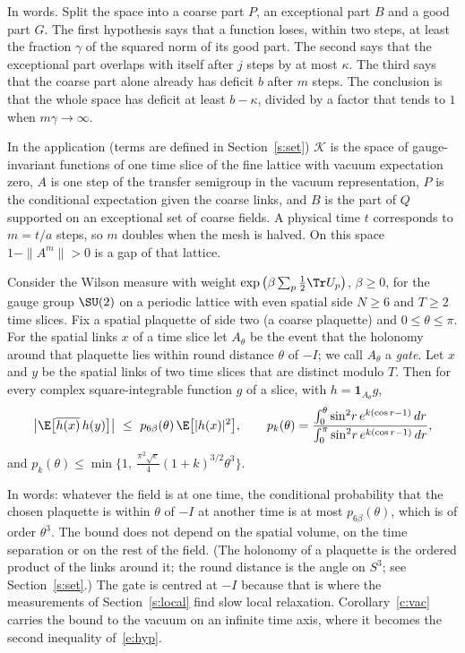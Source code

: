 In words. Split the space into a coarse part $P$, an exceptional part $B$ and a good part $G$. The first
hypothesis says that a function loses, within two steps, at least the fraction $\gamma$ of the squared norm of
its good part. The second says that the exceptional part overlaps with itself after $j$ steps by at most
$\kappa$. The third says that the coarse part alone already has deficit $b$ after $m$ steps. The conclusion is
that the whole space has deficit at least $b-\kappa$, divided by a factor that tends to $1$ when $m\gamma\to\infty$.

In the application (terms are defined in Section~\ref{s:set}) $\mathcal K$ is the space of gauge-invariant
functions of one time slice of the fine lattice with vacuum expectation zero, $A$ is one step of the transfer
semigroup in the vacuum representation, $P$ is the conditional expectation given the coarse links, and $B$
is the part of $Q$ supported on an exceptional set of coarse fields. A physical time $t$ corresponds to
$m=t/a$ steps, so $m$ doubles when the mesh is halved. On this space $1-\|A^m\|>0$ is a gap of that lattice.

\begin{theorem}\label{t:ret}
Consider the Wilson measure with weight $\exp\big(\beta\sum_p\tfrac12\Tr U_p\big)$, $\beta\ge0$, for the gauge
group $\SU(2)$ on a periodic lattice with even spatial side $N\ge6$ and $T\ge2$ time slices. Fix a spatial
plaquette of side two (a coarse plaquette) and $0\le\theta\le\pi$. For the spatial links $x$ of a time slice
let $A_\theta$ be the event that the holonomy around that plaquette lies within round distance $\theta$ of
$-I$; we call $A_\theta$ a \emph{gate}. Let $x$ and $y$ be the spatial links of two time slices that are distinct modulo $T$. Then for every
complex square-integrable function $g$ of a slice, with $h=\mathbf 1_{A_\theta}g$,
\begin{equation}\label{e:ret}
\big|\E\big[\overline{h(x)}\,h(y)\big]\big|\ \le\ p_{6\beta}(\theta)\,\E\big[|h(x)|^2\big],
\qquad
p_k(\theta)=\frac{\int_0^\theta\sin^2\!r\,e^{k(\cos r-1)}\,dr}{\int_0^\pi\sin^2\!r\,e^{k(\cos r-1)}\,dr},
\end{equation}
and $p_k(\theta)\le\min\{1,\ \tfrac{\pi^2\sqrt e}{4}(1+k)^{3/2}\theta^3\}$.
\end{theorem}

In words: whatever the field is at one time, the conditional probability that the chosen plaquette is within
$\theta$ of $-I$ at another time is at most $p_{6\beta}(\theta)$, which is of order $\theta^3$. The bound does not
depend on the spatial volume, on the time separation or on the rest of the field. (The holonomy of a
plaquette is the ordered product of the links around it; the round distance is the angle on $S^3$; see
Section~\ref{s:set}.) The gate is centred at $-I$ because that is where the measurements of
Section~\ref{s:local} find slow local relaxation. Corollary~\ref{c:vac} carries the bound to the vacuum on an
infinite time axis, where it becomes the second inequality of~\eqref{e:hyp}.

